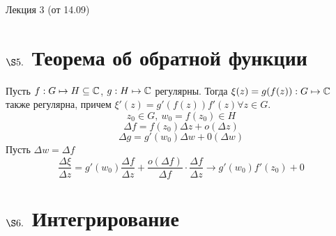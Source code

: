 \LARGE{Лекция 3 (от 14.09)}
\normalsize
\section{$\S 5.$ Теорема об обратной функции}
\theorem
Пусть $f: G \mapsto H \subseteq \mathbb{C}$, $g: H \mapsto \mathbb{C}$ регулярны.
Тогда $\xi(z) = g(f(z)): G \mapsto \mathbb{C}$ также регулярна, причем $\xi'(z) =
g'(f(z))f'(z) \forall z \in G$.
\pr
$$z_0 \in G, \ w_0 = f(z_0) \in H$$
$$\Delta f = f(z_0)\Delta z + o(\Delta z)$$
$$\Delta g = g'(w_0) \Delta w + 0(\Delta w)$$
Пусть $\Delta w = \Delta f$
$$\frac{\Delta \xi}{\Delta z} = g'(w_0) \frac{\Delta f}{\Delta z} +
\frac{o(\Delta f)}{\Delta f} \cdot \frac{\Delta f}{\Delta z} \rightarrow
g'(w_0)f'(z_0) + 0$$
\section{$\S 6.$ Интегрирование}